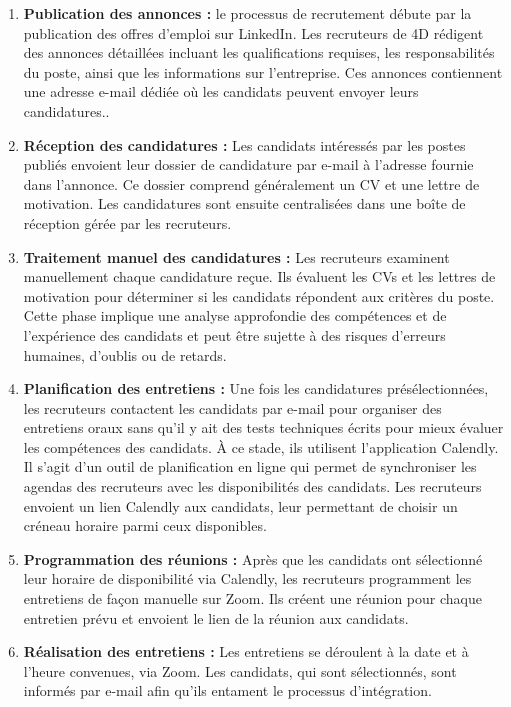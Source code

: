 \begin{enumerate}
   \item \textbf{Publication des annonces :} le processus de recrutement débute par la publication des offres d’emploi sur LinkedIn. Les recruteurs de 4D rédigent des annonces
   détaillées incluant les qualifications requises, les responsabilités du poste, ainsi que
   les informations sur l’entreprise. Ces annonces contiennent une adresse e-mail dédiée
   où les candidats peuvent envoyer leurs candidatures..
   \item \textbf{Réception des candidatures :} Les candidats intéressés par les postes publiés
   envoient leur dossier de candidature par e-mail à l’adresse fournie dans l’annonce. Ce
   dossier comprend généralement un CV et une lettre de motivation. Les candidatures
   sont ensuite centralisées dans une boîte de réception gérée par les recruteurs.
   
   \item \textbf{Traitement manuel des candidatures :} Les recruteurs examinent manuellement
   chaque candidature reçue. Ils évaluent les CVs et les lettres de motivation pour
   déterminer si les candidats répondent aux critères du poste. Cette phase implique
   une analyse approfondie des compétences et de l’expérience des candidats et peut
   être sujette à des risques d’erreurs humaines, d’oublis ou de retards.
   
   \item \textbf{Planification des entretiens :} Une fois les candidatures présélectionnées, les recruteurs contactent les candidats par e-mail pour organiser des entretiens oraux
   sans qu’il y ait des tests techniques écrits pour mieux évaluer les compétences des
   candidats. À ce stade, ils utilisent l’application Calendly. Il s’agit d’un outil de planification en ligne qui permet de synchroniser les agendas des recruteurs avec les
   disponibilités des candidats. Les recruteurs envoient un lien Calendly aux candidats,
   leur permettant de choisir un créneau horaire parmi ceux disponibles.
   \item \textbf{Programmation des réunions :} Après que les candidats ont sélectionné leur
   horaire de disponibilité via Calendly, les recruteurs programment les entretiens de
   façon manuelle sur Zoom. Ils créent une réunion pour chaque entretien prévu et
   envoient le lien de la réunion aux candidats.
   \item \textbf{Réalisation des entretiens :}  Les entretiens se déroulent à la date et à l’heure
   convenues, via Zoom. Les candidats, qui sont sélectionnés, sont informés par e-mail
   afin qu’ils entament le processus d’intégration.
   
\end{enumerate}

